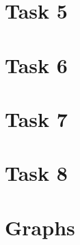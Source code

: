 \documentclass{article}
\begin{document}
    \section*{Task 5}
    \section*{Task 6}
    \section*{Task 7}
    \section*{Task 8}
    \section*{Graphs} 
\end{document}
